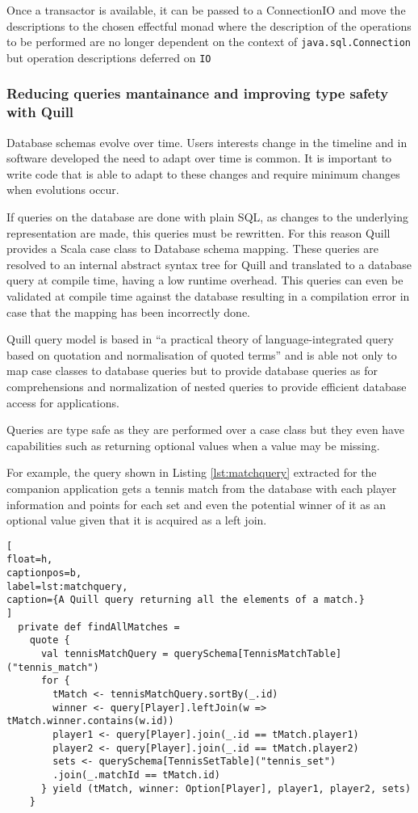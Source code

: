 \documentclass[../main.tex]{subfiles}
\begin{document}
Once a transactor is available, it can be passed to a ConnectionIO and move the
descriptions to the chosen effectful monad where the description of the
operations to be performed are no longer dependent on the context of
\texttt{java.sql.Connection} but operation descriptions deferred on \texttt{IO}

\subsubsection{Reducing queries mantainance and improving type safety with Quill}
Database schemas evolve over time. Users interests change in the timeline and in
software developed the need to adapt over time is common. It is important to
write code that is able to adapt to these changes and require minimum changes
when evolutions occur.

If queries on the database are done with plain SQL, as changes to the underlying
representation are made, this queries must be rewritten. For this reason Quill
\autocite{Quill}
provides a Scala case class to Database schema mapping. These queries are
resolved to an internal abstract syntax tree for Quill and translated to a
database query at compile time, having a low runtime overhead. This queries can
even be validated at compile time against the database resulting in a
compilation error in case that the mapping has been incorrectly done.

Quill query model is based in ``a  practical  theory  of  language-integrated
query  based  on quotation and normalisation of quoted terms'' \autocite{CheneyAQuery} and
is able not only to map case classes to database queries but to provide
database queries as for comprehensions and normalization of nested queries to
provide efficient database access for applications.

Queries are type safe as they are performed over a case class but they even have
capabilities such as returning optional values when a value may be missing.

For example, the query shown in Listing \ref{lst:matchquery} extracted for the companion application gets a tennis
match from the database with each player information and points for each set and
even the potential winner of it as an optional value given that it is acquired
as a left join.

\begin{lstlisting}[
float=h,
captionpos=b,
label=lst:matchquery,
caption={A Quill query returning all the elements of a match.}
]
  private def findAllMatches =
    quote {
      val tennisMatchQuery = querySchema[TennisMatchTable]("tennis_match")
      for {
        tMatch <- tennisMatchQuery.sortBy(_.id)
        winner <- query[Player].leftJoin(w => tMatch.winner.contains(w.id))
        player1 <- query[Player].join(_.id == tMatch.player1)
        player2 <- query[Player].join(_.id == tMatch.player2)
        sets <- querySchema[TennisSetTable]("tennis_set")
        .join(_.matchId == tMatch.id)
      } yield (tMatch, winner: Option[Player], player1, player2, sets)
    }
\end{lstlisting}
\end{document}
